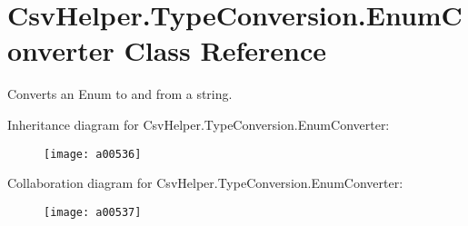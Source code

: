 \hypertarget{a00098}{\section{Csv\-Helper.\-Type\-Conversion.\-Enum\-Converter Class Reference}
\label{a00098}
}


Converts an Enum to and from a string.  




Inheritance diagram for Csv\-Helper.\-Type\-Conversion.\-Enum\-Converter\-:
\nopagebreak
\begin{figure}[H]
\begin{center}
\leavevmode
\texttt{[image: a00536]}
\end{center}
\end{figure}


Collaboration diagram for Csv\-Helper.\-Type\-Conversion.\-Enum\-Converter\-:
\nopagebreak
\begin{figure}[H]
\begin{center}
\leavevmode
\texttt{[image: a00537]}
\end{center}
\end{figure}
